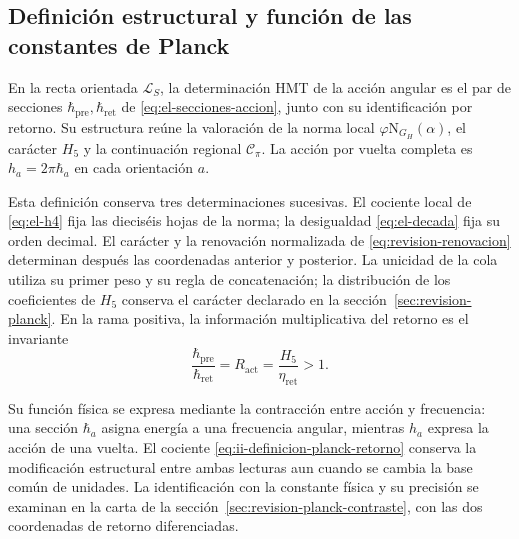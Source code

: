\subsection{Definición estructural y función de las constantes de Planck}
\label{sec:ii-definicion-planck}

\begin{definition}
En la recta orientada \(\mathcal L_S\), la determinación HMT de la
acción angular es el par de secciones
\(\hbar_{\mathrm{pre}},\hbar_{\mathrm{ret}}\) de
\eqref{eq:el-secciones-accion}, junto con su identificación por retorno.
Su estructura reúne la valoración de la norma local
\(\varphi\mathrm N_{G_H}(\alpha)\), el carácter \(H_5\) y la
continuación regional \(\mathcal C_\pi\). La acción por vuelta completa
es \(h_a=2\pi\hbar_a\) en cada orientación \(a\).
\end{definition}

Esta definición conserva tres determinaciones sucesivas. El cociente
local de \eqref{eq:el-h4} fija las dieciséis hojas de la norma; la
desigualdad \eqref{eq:el-decada} fija su orden decimal. El carácter y
la renovación normalizada de \eqref{eq:revision-renovacion} determinan
después las coordenadas anterior y posterior. La unicidad de la cola
utiliza su primer peso y su regla de concatenación; la distribución de
los coeficientes de \(H_5\) conserva el carácter declarado en la
sección~\ref{sec:revision-planck}. En la rama positiva, la información
multiplicativa del retorno es el invariante
\begin{equation}
 \frac{\hbar_{\mathrm{pre}}}{\hbar_{\mathrm{ret}}}
 =R_{\mathrm{act}}=\frac{H_5}{\eta_{\mathrm{ret}}}>1.
 \label{eq:ii-definicion-planck-retorno}
\end{equation}

Su función física se expresa mediante la contracción entre acción y
frecuencia: una sección \(\hbar_a\) asigna energía a una frecuencia
angular, mientras \(h_a\) expresa la acción de una vuelta. El cociente
\eqref{eq:ii-definicion-planck-retorno} conserva la modificación
estructural entre ambas lecturas aun cuando se cambia la base común
de unidades. La identificación con la constante física y su precisión
se examinan en la carta de la sección~\ref{sec:revision-planck-contraste},
con las dos coordenadas de retorno diferenciadas.
